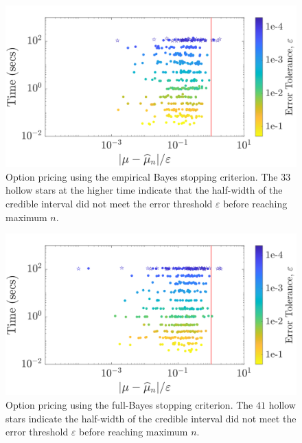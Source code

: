 \documentclass[graybox,footinfo]{svmult}
\begin{document}
\begin{figure}
\centering
\includegraphics[width=0.95\linewidth]{"figures/Sobol/Sobol_optPrice_guaranteed_time_MLE__d12_r1_2019-Sep-1"}
\caption[Sobol: Option pricing guaranteed:EB]{Option pricing using the empirical Bayes stopping criterion. The $33$ hollow stars at the higher time indicate that the half-width of the credible interval did not meet the error threshold $\varepsilon$ before reaching maximum $n$.}
\label{FJ:fig:Sobol-optprice-guaranteed-EB}
\end{figure}
\begin{figure}
\centering
\includegraphics[width=0.95\linewidth]{"figures/Sobol/Sobol_optPrice_guaranteed_time_full__d12_r1_2019-Sep-1"}
\caption[Sobol: Option pricing guaranteed: Full Bayes]{Option pricing using the full-Bayes stopping criterion. The $41$ hollow stars indicate the half-width of the credible interval did not meet the error threshold $\varepsilon$ before reaching maximum $n$.
}
\label{FJ:fig:Sobol-optprice-guaranteed-FB}
\end{figure}
\end{document}
